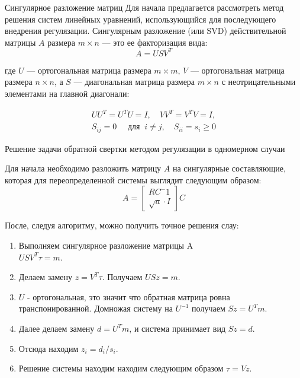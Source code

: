 \documentclass[fullscreen=true,russian,compress,%
	hyperref={unicode,bookmarks=false}]{presentation}
\begin{document}
\begin{frame}{Сингулярное разложение матриц}
   Для начала предлагается рассмотреть метод решения систем линейных уравнений, использующийся для последующего внедрения регулязации.
   Сингулярным разложение (или SVD) действительной матрицы $A$ размера $m \times n$ — это ее факторизация вида: 
   \begin{equation}
       A = U S V^T 
       \label{svd_decomp}
   \end{equation}
   
   где $U$ — ортогональная матрица размера $m \times m$, $V$ — ортогональная матрица размера $n \times n$, а $S$ — диагональная матрица размера 
   $m \times n$ с неотрицательными элементами на главной диагонали: 
   
   \begin{equation}
       \begin{array}{l}
           U U^T = U^T U = I, \quad VV ^T = V^T V = I, \\
           S_{ij} = 0 \quad \text{ для } \ i \neq j, \quad S_{ii} = s_{i} \geq 0
       \end{array}
   \end{equation}
\end{frame}

\begin{frame}{Решение задачи обратной свертки методом регулязации в одномерном случаи}

Для начала необходимо разложить матрицу $A$ на сингулярные составляющие, которая для переопределенной системы 
выглядит следующим образом:
\begin{equation}
   A =
   \begin{bmatrix}
      RC^-1 \\
      \sqrt{a} \cdot I
  \end{bmatrix}
  C 
\end{equation}

После, следуя алгоритму, можно получить точное решения слау:

\begin{enumerate}
    \item Выполняем сингулярное разложение матрицы A \\
    $USV^T \tau = m.$
    \item Делаем замену $z = V^T\tau$. Получаем $USz = m.$
    \item $U$ - ортогональная, это значит что обратная матрица ровна транспонированной. Домножая систему на $U^{-1}$ получаем $Sz=U^Tm$.
    \item Далее делаем замену $d=U^Tm$, и система принимает вид $Sz=d$.
    \item Отсюда находим $z_{i} = d_{i} / s_{i}$.
    \item Решение системы находим находим следующим образом $\tau = Vz$.
\end{enumerate}

\end{frame}
\end{document}
